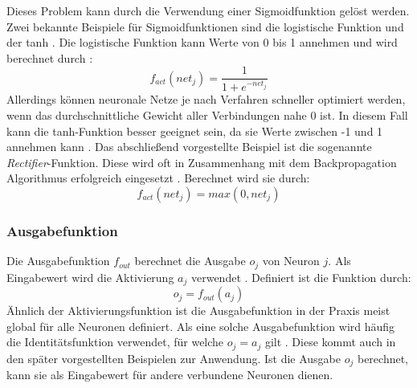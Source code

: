 Dieses Problem kann durch die Verwendung einer Sigmoidfunktion gelöst werden. Zwei bekannte Beispiele für Sigmoidfunktionen sind die logistische Funktion und der \ac{tanh} \cite{lecun2012efficient}. Die logistische Funktion kann Werte von 0 bis 1 annehmen und wird berechnet durch \cite{kriesel2008kleiner}: 
$$f_{act}(net_j)=\frac{1}{1+e^{-net_j}}$$
Allerdings können neuronale Netze je nach Verfahren schneller optimiert werden, wenn das durchschnittliche Gewicht aller Verbindungen nahe 0 ist. In diesem Fall kann die \ac{tanh}-Funktion besser geeignet sein, da sie Werte zwischen -1 und 1 annehmen kann \cite{lecun2012efficient}. Das abschließend vorgestellte Beispiel ist die sogenannte \emph{Rectifier}-Funktion. Diese wird oft in Zusammenhang mit dem Backpropagation Algorithmus erfolgreich eingesetzt \cite{glorot2011deep}. Berechnet wird sie durch:
$$f_{act}(net_j)= max(0, net_j)$$

\subsubsection{Ausgabefunktion}
Die Ausgabefunktion $f_{out}$ berechnet die Ausgabe $o_j$ von Neuron $j$. Als Eingabewert wird die Aktivierung $a_j$ verwendet \cite{zell2003simulation}. Definiert ist die Funktion durch:
$$o_j = f_{out}(a_j)$$
Ähnlich der Aktivierungsfunktion ist die Ausgabefunktion in der Praxis meist global für alle Neuronen definiert. Als eine solche Ausgabefunktion wird häufig die Identitätsfunktion verwendet, für welche $o_j = a_j$ gilt \cite{kriesel2008kleiner}. Diese kommt auch in den später vorgestellten Beispielen zur Anwendung. Ist die Ausgabe $o_j$ berechnet, kann sie als Eingabewert für andere verbundene Neuronen dienen.

